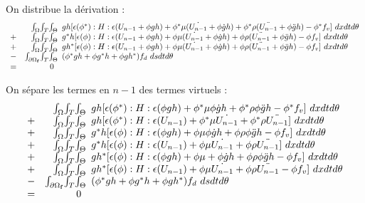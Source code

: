 On distribue la dérivation : 
\begin{equation}
\begin{array}{r r l}
	&\int_\Omega \! \int_T \! \int_\Theta \!\!\!&		
		gh[\epsilon (\phi^*) : H : \epsilon (U_{n-1} + \phi gh)
			+ \phi^* \mu (\dot{U_{n-1}} + \phi \dot{g}h)
			+ \phi^* \rho (\ddot{U_{n-1}} + \phi \ddot{g}h)
			- \phi^* f_v
			] ~dx dt d\theta
	\\
	+ &\int_\Omega \! \int_T \! \int_\Theta \!\!\!&		
		g^*h[\epsilon (\phi) : H : \epsilon (U_{n-1} + \phi gh)
			+ \phi \mu (\dot{U_{n-1}} + \phi \dot{g}h) 
			+ \phi \rho (\ddot{U_{n-1}} + \phi \ddot{g}h)
			- \phi f_v
			] ~dx dt d\theta
	\\
	+ &\int_\Omega \! \int_T \! \int_\Theta \!\!\!&		
		gh^*[\epsilon (\phi) : H : \epsilon (U_{n-1} + \phi gh)
			+ \phi \mu (\dot{U_{n-1}} + \phi\dot{g}h)
			+ \phi \rho (\ddot{U_{n-1}} + \phi\ddot{g}h)
			- \phi f_v
			] ~dx dt d\theta
	\\
	- &\int_{\partial \Omega_\mathbf{f}} \! \int_T \! \int_\Theta \!\!\!&
		(\phi^*gh + \phi g^*h + \phi gh^*) f_d  ~ds dt d\theta
\\
	= &0& 
\end{array}
\end{equation}

On sépare les termes en $n-1$ des termes virtuels :
\begin{equation}
\begin{array}{r r l}
	&\int_\Omega \! \int_T \! \int_\Theta \!\!\!&		
		gh[\epsilon (\phi^*) : H : \epsilon (\phi gh)
			+ \phi^* \mu \phi\dot{g}h
			+ \phi^* \rho \phi\ddot{g}h
			- \phi^* f_v
			] ~dx dt d\theta
	\\
	+ &\int_\Omega \! \int_T \! \int_\Theta \!\!\!&		
		gh[\epsilon (\phi^*) : H : \epsilon (U_{n-1})
			+ \phi^* \mu \dot{U_{n-1}} 
			+ \phi^* \rho \ddot{U_{n-1}}
			] ~dx dt d\theta
	\\
	+ &\int_\Omega \! \int_T \! \int_\Theta \!\!\!&		
		g^*h[\epsilon (\phi) : H : \epsilon ( \phi gh)
			+ \phi \mu  \phi\dot{g}h
			+ \phi \rho \phi\ddot{g}h
			- \phi f_v
			] ~dx dt d\theta
	\\
	+ &\int_\Omega \! \int_T \! \int_\Theta \!\!\!&		
		g^*h[\epsilon (\phi) : H : \epsilon (U_{n-1})
			+ \phi \mu \dot{U_{n-1}}
			+ \phi \rho \ddot{U_{n-1}}
			] ~dx dt d\theta
	\\
	+ &\int_\Omega \! \int_T \! \int_\Theta \!\!\!&		
		gh^*[\epsilon (\phi) : H : \epsilon (\phi gh)
			+ \phi \mu + \phi\dot{g}h
			+ \phi \rho \phi\ddot{g}h
			- \phi f_v
			] ~dx dt d\theta
	\\
	+ &\int_\Omega \! \int_T \! \int_\Theta \!\!\!&		
		gh^*[\epsilon (\phi) : H : \epsilon (U_{n-1})
			+ \phi \mu \dot{U_{n-1}}
			+ \phi \rho \ddot{U_{n-1}}
			- \phi f_v
			] ~dx dt d\theta
	\\
	- &\int_{\partial \Omega_\mathbf{f}} \! \int_T \! \int_\Theta \!\!\!&
		(\phi^*gh + \phi g^*h + \phi gh^*) f_d  ~ds dt d\theta
	\\
	= &0& 
\end{array}
\end{equation}


